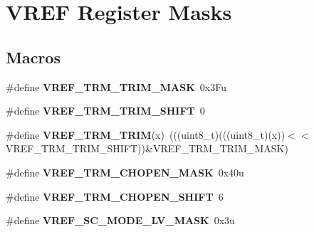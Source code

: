 \hypertarget{group__VREF__Register__Masks}{}\section{V\+R\+EF Register Masks}
\label{group__VREF__Register__Masks}
\subsection*{Macros}
\begin{DoxyCompactItemize}
\item 
\#define {\bfseries V\+R\+E\+F\+\_\+\+T\+R\+M\+\_\+\+T\+R\+I\+M\+\_\+\+M\+A\+SK}~0x3\+Fu\hypertarget{group__VREF__Register__Masks_gaf233ddf56401003ec721b808d3910978}{}\label{group__VREF__Register__Masks_gaf233ddf56401003ec721b808d3910978}

\item 
\#define {\bfseries V\+R\+E\+F\+\_\+\+T\+R\+M\+\_\+\+T\+R\+I\+M\+\_\+\+S\+H\+I\+FT}~0\hypertarget{group__VREF__Register__Masks_ga7738b4edb18c8c9dcb36d6be564c80e6}{}\label{group__VREF__Register__Masks_ga7738b4edb18c8c9dcb36d6be564c80e6}

\item 
\#define {\bfseries V\+R\+E\+F\+\_\+\+T\+R\+M\+\_\+\+T\+R\+IM}(x)~(((uint8\+\_\+t)(((uint8\+\_\+t)(x))$<$$<$V\+R\+E\+F\+\_\+\+T\+R\+M\+\_\+\+T\+R\+I\+M\+\_\+\+S\+H\+I\+FT))\&V\+R\+E\+F\+\_\+\+T\+R\+M\+\_\+\+T\+R\+I\+M\+\_\+\+M\+A\+SK)\hypertarget{group__VREF__Register__Masks_ga7b200f282af693ea614c6bb380a5bfb8}{}\label{group__VREF__Register__Masks_ga7b200f282af693ea614c6bb380a5bfb8}

\item 
\#define {\bfseries V\+R\+E\+F\+\_\+\+T\+R\+M\+\_\+\+C\+H\+O\+P\+E\+N\+\_\+\+M\+A\+SK}~0x40u\hypertarget{group__VREF__Register__Masks_gaca90564d0247d6637d487fa045dbe328}{}\label{group__VREF__Register__Masks_gaca90564d0247d6637d487fa045dbe328}

\item 
\#define {\bfseries V\+R\+E\+F\+\_\+\+T\+R\+M\+\_\+\+C\+H\+O\+P\+E\+N\+\_\+\+S\+H\+I\+FT}~6\hypertarget{group__VREF__Register__Masks_gad66c35e7a2372a16a0ef1042ad0d029a}{}\label{group__VREF__Register__Masks_gad66c35e7a2372a16a0ef1042ad0d029a}

\item 
\#define {\bfseries V\+R\+E\+F\+\_\+\+S\+C\+\_\+\+M\+O\+D\+E\+\_\+\+L\+V\+\_\+\+M\+A\+SK}~0x3u\hypertarget{group__VREF__Register__Masks_ga7eb8ab4b25ed9f93b23d7199c50e7181}{}\label{group__VREF__Register__Masks_ga7eb8ab4b25ed9f93b23d7199c50e7181}


\end{DoxyCompactItemize}
